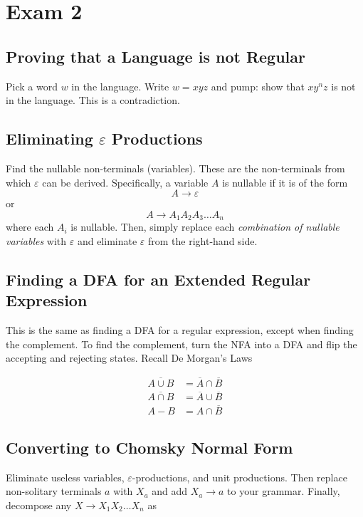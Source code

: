 \section{Exam 2}\label{subsec:exam-2-cheatsheet}
\subsection{Proving that a Language is not Regular}
Pick a word \(w\) in the language. Write \(w=xyz\) and pump: show that \(xy^n z\) is not in the language. This is a contradiction.

\subsection{Eliminating \texorpdfstring{\(\varepsilon \)}{e} Productions}
Find the nullable non-terminals (variables). These are the non-terminals from which \(\varepsilon \) can be derived. Specifically, a variable \(A\) is nullable if it is of the form \[A\to\varepsilon \] or \[A\to A_1A_2A_3\hdots A_n\] where each \(A_i\) is nullable. Then, simply replace each \textit{combination of nullable variables} with \(\varepsilon \) and eliminate \(\varepsilon \) from the right-hand side. 

\subsection{Finding a DFA for an Extended Regular Expression}
This is the same as finding a DFA for a regular expression, except when finding the complement. To find the complement, turn the NFA into a DFA and flip the accepting and rejecting states. Recall De Morgan's Laws

\begin{align*}
    \overline{A\cup B} &= \overline{A} \cap \overline{B}\\
    \overline{A\cap B} &= \overline{A} \cup \overline{B}\\
    A-B&=A\cap\overline{B}
\end{align*}

\subsection{Converting to Chomsky Normal Form}
Eliminate useless variables, \(\varepsilon \)-productions, and unit productions. Then replace non-solitary terminals \(a\) with \(X_a\) and add \(X_a\to a\) to your grammar. Finally, decompose any \(X\to X_1X_2\hdots X_n\) as

